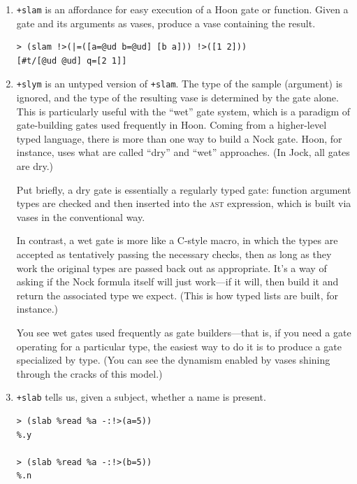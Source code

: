 \documentclass[twoside]{article}
\begin{document}
\begin{enumerate}

  \item  \lstinline[style=inlinecode]{+slam} is an affordance for easy execution of a Hoon gate or function.  Given a gate and its arguments as vases, produce a vase containing the result.

\begin{lstlisting}[style=listingcode]
> (slam !>(|=([a=@ud b=@ud] [b a])) !>([1 2]))
[#t/[@ud @ud] q=[2 1]]
\end{lstlisting}

  \item  \lstinline[style=inlinecode]{+slym} is an untyped version of \lstinline[style=inlinecode]{+slam}.  The type of the sample (argument) is ignored, and the type of the resulting vase is determined by the gate alone.  This is particularly useful with the ``wet'' gate system, which is a paradigm of gate-building gates used frequently in Hoon.  Coming from a higher-level typed language, there is more than one way to build a Nock gate.  Hoon, for instance, uses what are called “dry” and “wet” approaches.  (In Jock, all gates are dry.)

  Put briefly, a dry gate is essentially a regularly typed gate:  function argument types are checked and then inserted into the \textsc{ast} expression, which is built via vases in the conventional way.

  In contrast, a wet gate is more like a C-style macro, in which the types are accepted as tentatively passing the necessary checks, then as long as they work the original types are passed back out as appropriate.  It's a way of asking if the Nock formula itself will just work—if it will, then build it and return the associated type we expect.  (This is how typed lists are built, for instance.)

  You see wet gates used frequently as gate builders—that is, if you need a gate operating for a particular type, the easiest way to do it is to produce a gate specialized by type.  (You can see the dynamism enabled by vases shining through the cracks of this model.)

  \item  \lstinline[style=inlinecode]{+slab} tells us, given a subject, whether a name is present.

  \begin{lstlisting}[style=listingcode]
> (slab %read %a -:!>(a=5))
%.y

> (slab %read %a -:!>(b=5))
%.n
\end{lstlisting}


\end{enumerate}
\end{document}
